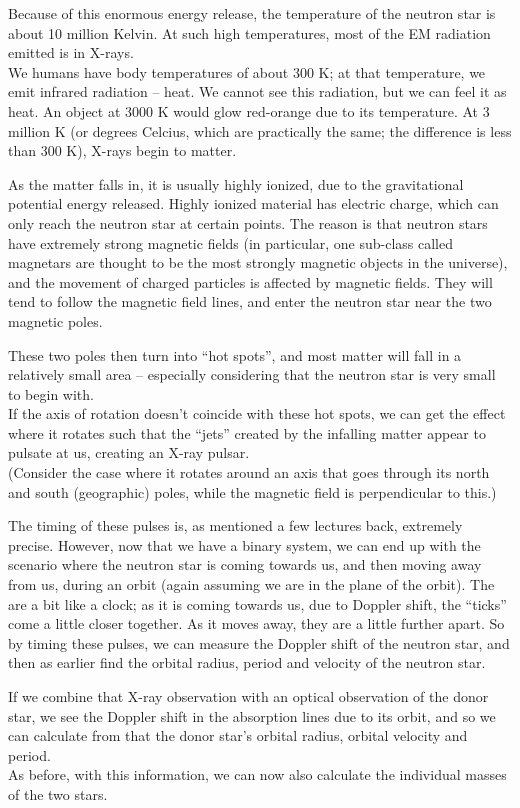 Because of this enormous energy release, the temperature of the neutron star is about 10 million Kelvin. At such high temperatures, most of the EM radiation emitted is in X-rays.\\
We humans have body temperatures of about 300 K; at that temperature, we emit infrared radiation -- heat. We cannot see this radiation, but we can feel it as heat. An object at 3000 K would glow red-orange due to its temperature. At 3 million K (or degrees Celcius, which are practically the same; the difference is less than 300 K), X-rays begin to matter.

As the matter falls in, it is usually highly ionized, due to the gravitational potential energy released. Highly ionized material has electric charge, which can only reach the neutron star at certain points. The reason is that neutron stars have extremely strong magnetic fields (in particular, one sub-class called magnetars are thought to be the most strongly magnetic objects in the universe), and the movement of charged particles is affected by magnetic fields. They will tend to follow the magnetic field lines, and enter the neutron star near the two magnetic poles.

These two poles then turn into ``hot spots'', and most matter will fall in a relatively small area -- especially considering that the neutron star is very small to begin with.\\
If the axis of rotation doesn't coincide with these hot spots, we can get the effect where it rotates such that the ``jets'' created by the infalling matter appear to pulsate at us, creating an X-ray pulsar.\\
(Consider the case where it rotates around an axis that goes through its north and south (geographic) poles, while the magnetic field is perpendicular to this.)

The timing of these pulses is, as mentioned a few lectures back, extremely precise. However, now that we have a binary system, we can end up with the scenario where the neutron star is coming towards us, and then moving away from us, during an orbit (again assuming we are in the plane of the orbit). The are a bit like a clock; as it is coming towards us, due to Doppler shift, the ``ticks'' come a little closer together. As it moves away, they are a little further apart. So by timing these pulses, we can measure the Doppler shift of the neutron star, and then as earlier find the orbital radius, period and velocity of the neutron star.

If we combine that X-ray observation with an optical observation of the donor star, we see the Doppler shift in the absorption lines due to its orbit, and so we can calculate from that the donor star's orbital radius, orbital velocity and period.\\
As before, with this information, we can now also calculate the individual masses of the two stars.

